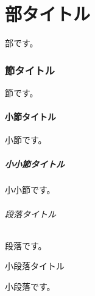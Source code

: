 \documentclass{ltjsarticle}
\begin{document}
\tableofcontents
\newpage
\part{部タイトル}
部です。
\section{節タイトル}
節です。
\subsection{小節タイトル}
小節です。
\subsubsection{小小節タイトル}
小小節です。
\paragraph{段落タイトル}
段落です。
\subparagraph{小段落タイトル}
小段落です。
\end{document}
